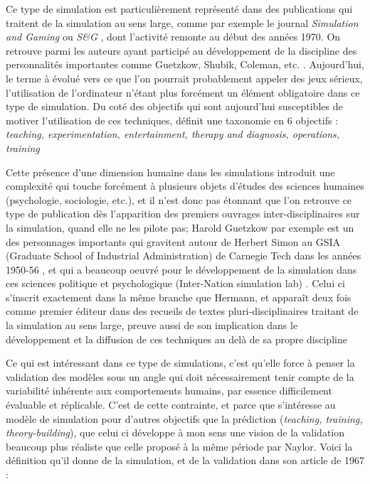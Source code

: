 Ce type de simulation est particulièrement représenté dans des publications qui traitent de la simulation au sens large, comme par exemple le journal \textit{Simulation and Gaming} ou \textit{S\&G} \autocite{Crookall2011}, dont l'activité remonte au début des années 1970. On retrouve parmi les auteurs ayant participé au développement de la discipline des personnalités importantes comme Guetzkow, Shubik, Coleman, etc. \autocite{Crookall2012}. Aujourd'hui, le terme à évolué vers ce que l'on pourrait probablement appeler des jeux sérieux, l'utilisation de l'ordinateur n'étant plus forcément un élément obligatoire dans ce type de simulation. Du coté des objectifs qui sont aujourd'hui susceptibles de motiver l'utilisation de ces techniques, \textcite{Shubik2009} définit une taxonomie en 6 objectifs : \textit{teaching, experimentation, entertainment, therapy and diagnosis, operations, training }

Cette présence d'une dimension humaine dans les simulations introduit une complexité qui touche forcément à plusieurs objets d'études des sciences humaines (psychologie, sociologie, etc.), et il n'est donc pas étonnant que l'on retrouve ce type de publication dès l'apparition des premiers ouvrages inter-disciplinaires sur la simulation, quand elle ne les pilote pas; Harold Guetzkow par exemple est un des personnages importants qui gravitent autour de Herbert Simon au GSIA (Graduate School of Industrial Administration) de Carnegie Tech dans les années 1950-56 \autocite{Guetzkow2004}, et qui a beaucoup oeuvré pour le développement de la simulation dans ces sciences politique et psychologique (Inter-Nation simulation lab) \autocite{Janda2011, Druckman2010}. Celui ci s'inscrit exactement dans la même branche que Hermann, et apparaît deux fois comme premier éditeur dans des recueils de textes pluri-disciplinaires traitant de la simulation au sens large, preuve aussi de son implication dans le développement et la diffusion de ces techniques au delà de sa propre discipline \autocite{Guetzkow1962, Guetzkow1972}

Ce qui est intéressant dans ce type de simulations, c'est qu'elle force à penser la validation des modèles sous un angle qui doit nécessairement tenir compte de la variabilité inhérente aux comportements humains, par essence difficilement évaluable et réplicable. C'est de cette contrainte, et parce que \textcite{Hermann1967} s'intéresse au modèle de simulation pour d'autres objectifs que la prédiction (\textit{teaching, training, theory-building}), que celui ci développe à mon sens une vision de la validation beaucoup plus réaliste que celle proposé à la même période par Naylor. Voici la définition qu'il donne de la simulation, et de la validation dans son article de 1967 :

